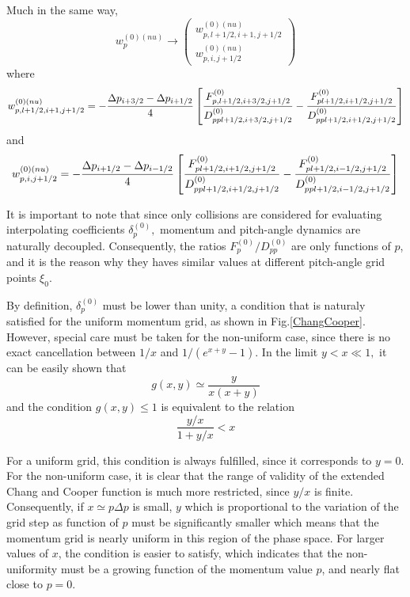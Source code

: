 Much in the same way,
\begin{equation}
w_{p}^{\left( 0\right) (nu)}\rightarrow \left(
\begin{array}{l}
w_{p,l+1/2,i+1,j+1/2}^{\left( 0\right) (nu)} \\
w_{p,i,j+1/2}^{\left( 0\right) (nu)}
\end{array}
\right)
\end{equation}
where
\begin{equation}
w_{p,l+1/2,i+1,j+1/2}^{\left( 0\right) (nu)}=-\frac{\Delta p_{i+3/2}-\Delta
p_{i+1/2}}{4}\left[ \frac{F_{p,l+1/2,i+3/2,j+1/2}^{\left( 0\right) }}{%
D_{ppl+1/2,i+3/2,j+1/2}^{\left( 0\right) }}-\frac{F_{pl+1/2,i+1/2,j+1/2}^{%
\left( 0\right) }}{D_{ppl+1/2,i+1/2,j+1/2}^{\left( 0\right) }}\right]
\end{equation}
and
\begin{equation}
w_{p,i,j+1/2}^{\left( 0\right) (nu)}=-\frac{\Delta p_{i+1/2}-\Delta p_{i-1/2}%
}{4}\left[ \frac{F_{pl+1/2,i+1/2,j+1/2}^{\left( 0\right) }}{%
D_{ppl+1/2,i+1/2,j+1/2}^{\left( 0\right) }}-\frac{F_{pl+1/2,i-1/2,j+1/2}^{%
\left( 0\right) }}{D_{ppl+1/2,i-1/2,j+1/2}^{\left( 0\right) }}\right]
\end{equation}

It is important to note that since only collisions are considered for
evaluating interpolating coefficients $\delta _{p}^{\left( 0\right) },$
momentum and pitch-angle dynamics are naturally decoupled. Consequently, the
ratios $F_{p}^{\left( 0\right) }/D_{pp}^{\left( 0\right) }$ are only
functions of $p$, and it is the reason why they haves similar values at
different pitch-angle grid points $\xi _{0}.$

By definition, $\delta _{p}^{\left( 0\right) }$ must be lower than unity, a
condition that is naturaly satisfied for the uniform momentum grid, as shown
in Fig.\ref{ChangCooper}. However, special care must be taken for the
non-uniform case, since there is no exact cancellation between $1/x$ and $%
1/\left( e^{x+y}-1\right) $. In the limit $y<x\ll 1,$ it can be easily shown
that
\begin{equation}
g\left( x,y\right) \simeq \frac{y}{x\left( x+y\right) }
\end{equation}
and the condition $g\left( x,y\right) \leq 1$ is equivalent to the relation
\begin{equation}
\frac{y/x}{1+y/x}<x
\end{equation}

For a uniform grid, this condition is always fulfilled, since it corresponds
to $y=0$. For the non-uniform case, it is clear that the range of validity
of the extended Chang and Cooper function is much more restricted, since $y/x
$ is finite. Consequently, if $x\simeq p\Delta p$ is small, $y$ which is
proportional to the variation of the grid step as function of $p$ must be
significantly smaller which means that the momentum grid is nearly uniform
in this region of the phase space. For larger values of $x$, the condition
is easier to satisfy, which indicates that the non-uniformity must be a
growing function of the momentum value $p$, and nearly flat close to $p=0$.

